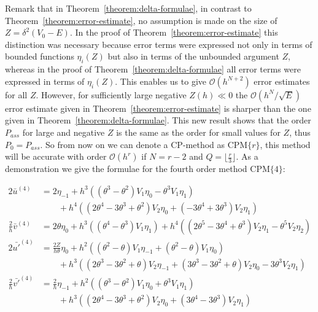 Remark that in Theorem~\ref{theorem:delta-formulae}, in contrast to Theorem~\ref{theorem:error-estimate}, no assumption is made on the size of $Z=\delta^2 (V_0-E)$. In the proof of Theorem~\ref{theorem:error-estimate} this distinction was necessary because error terms were expressed
not only in terms of bounded functions $\eta_i(Z)$ but also in terms of the unbounded argument $Z$, whereas in the proof of
Theorem~\ref{theorem:delta-formulae} all error terms were expressed in terms of $\eta_i(Z)$. This enables us to give $\mathcal{O}(h^{N+2})$ error estimates for all $Z$. However, for sufficiently large negative $Z(h) \ll 0$ the $\mathcal{O}({h^N}/{\sqrt{E}})$ error estimate given in Theorem~\ref{theorem:error-estimate} is sharper than the one given in Theorem~\ref{theorem:delta-formulae}. This new result shows that the order $P_{ass}$ for large and negative $Z$ is the same as the order for small values for $Z$, thus $P_0 = P_{ass}$. So from now on we can denote a CP-method as $\text{CPM}\{r\}$, this method will be accurate with order $\mathcal{O}(h^r)$ if $N=r-2$ and $Q=\lfloor \frac{r}{3} \rfloor$. As a demonstration we give the formulae for the fourth order method $\text{CPM}\{4\}$:

\begin{align*}
  2\bar{u}^{(4)}            & = 2 \eta_{-1} + h^{3}\left(\left(\theta^{3} - \theta^{2}\right) V_{1} \eta_{0} -\theta^{3} V_{1} \eta_{1}\right)                                                                                                 \\
                            & \quad\quad + h^{4}\left(\left(2 \theta^{4} - 3 \theta^{3} + \theta^{2}\right) V_{2} \eta_{0} + \left(-3 \theta^{4} + 3 \theta^{3}\right) V_{2} \eta_{1}\right)                                                   \\
  \frac{2}{h}\bar{v}^{(4)}  & = 2 \theta \eta_{0} + h^{3}\left(\left(\theta^{4} - \theta^{3}\right) V_{1} \eta_{1}\right) + h^{4}\left(\left(2 \theta^{5} - 3 \theta^{4} + \theta^{3}\right) V_{2} \eta_{1} - \theta^{5} V_{2} \eta_{2}\right) \\
  2\bar{u'}^{(4)}           & = \frac{2Z}{h\theta} \eta_0 + h^{2}\left(\left(\theta^{2} - \theta\right) V_{1} \eta_{-1} + \left(\theta^{2} - \theta\right) V_{1} \eta_{0}\right)                                                               \\
                            & \quad\quad+ h^{3}\left(\left(2 \theta^{3} - 3 \theta^{2} + \theta\right) V_{2} \eta_{-1} + \left(3 \theta^{3} - 3 \theta^{2} + \theta\right) V_{2} \eta_{0} - 3 \theta^{3} V_{2} \eta_{1}\right)                 \\
  \frac{2}{h}\bar{v'}^{(4)} & = \frac{2}{h} \eta_{-1} + h^{2}\left(\left(\theta^{3} - \theta^{2}\right) V_{1} \eta_{0} + \theta^{3} V_{1} \eta_{1}\right)                                                                                      \\
                            & \quad\quad + h^{3}\left(\left(2 \theta^{4} - 3 \theta^{3} + \theta^{2}\right) V_{2} \eta_{0} + \left(3 \theta^{4} - 3 \theta^{3}\right) V_{2} \eta_{1}\right)                                                    \\
\end{align*}%

